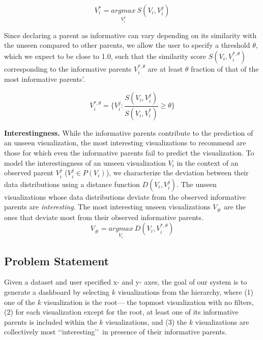 \begin{equation}
    V_i^*=\underset{V_i^j}{argmax}\ S(V_i, V_i^j)
\end{equation}

Since declaring a parent as informative can vary depending on its similarity with the unseen compared to other parents, we allow the user to specify a threshold $\theta$, which we expect to be close to 1.0, such that the similarity score $S(V_i, V_i^{*, \theta})$ corresponding to the informative parents $V_i^{*, \theta}$ are at least $\theta$ fraction of that of the most informative parents'.

\begin{equation}
    V_i^{*, \theta} = \{V_i^j : \frac{S(V_i, V_i^j)}{S(V_i, V_i^*)} \ge \theta\}
\end{equation}

\textbf{Interestingness.} While the informative parents contribute to the prediction of an unseen visualization, the most interesting visualizations to recommend are those for which even the informative parents fail to predict the visualization. To model the interestingness of an unseen visualization $V_i$ in the context of an observed parent $V_i^j$ ($V_i^j \in P(V_i)$), we characterize the deviation between their data distributions using a distance function $D(V_i, V_i^j)$. The unseen visualizations whose data distributions deviate from the observed informative parents are \emph{interesting}. The most interesting unseen visualizations $V_\#$ are the ones that deviate most from their observed informative parents.
\begin{equation}
    V_\#=\underset{V_i}{argmax} \ D(V_i, V_i^{*, \theta})
\end{equation}


\subsection{Problem Statement}

Given a dataset and user specified x- and y- axes, the goal of our system is to generate a dashboard by selecting $k$ visualizations from the hierarchy, where (1) one of the $k$ visualization is the root--- the topmost visualization with no filters, (2) for each visualization except for the root, at least one of its informative parents is included within the $k$ visualizations, and (3) the $k$ visualizations are collectively most \lq\lq interesting\rq\rq\ in presence of their informative parents.

